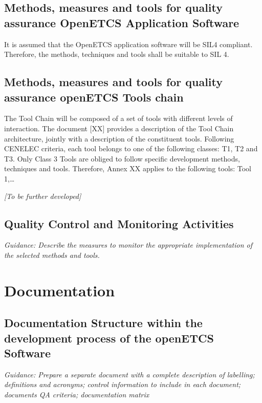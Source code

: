 \documentclass{template/openetcs_article}
\begin{document}
\subsection{Methods, measures and tools for quality assurance OpenETCS Application Software}

It is assumed that the OpenETCS application software will be SIL4 compliant. Therefore, the methods, techniques and tools shall be suitable to SIL 4. 

\subsection{Methods, measures and tools for quality assurance openETCS Tools chain}

The Tool Chain will be composed of a set of tools with different levels of interaction. The document [XX] provides a description of the Tool Chain architecture, jointly with a description of the constituent tools.
Following CENELEC criteria, each tool belongs to one of the following classes: T1, T2 and T3. Only Class 3 Tools are obliged to follow specific development methods, techniques and tools. Therefore, Annex XX applies to the following tools: Tool 1,{\dots}

\textit{[To be further developed]}

\subsection{Quality Control and Monitoring Activities}
\textit{Guidance: Describe the measures to monitor the appropriate implementation of the selected methods and tools.}



\section{Documentation}

\subsection{Documentation Structure within the development process of the openETCS Software}
\textit{Guidance: Prepare a separate document with a complete description of labelling; definitions and acronyms; control information to include in each document; documents QA criteria; documentation matrix}
\end{document}
